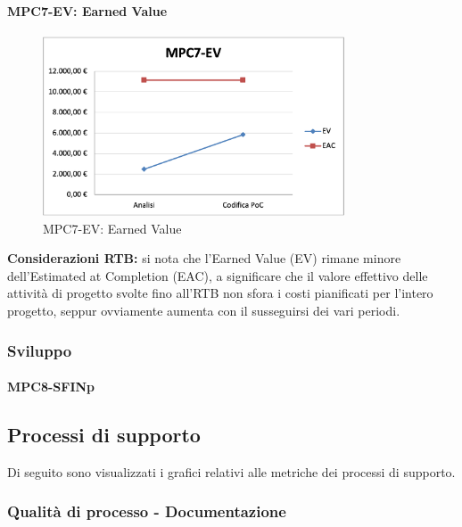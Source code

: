 \paragraph{MPC7-EV: Earned Value}
\begin{figure}[h!] 
    \centering
    \includegraphics[width=0.8\textwidth]{images/MPC7-EV.png}
    \caption{MPC7-EV: Earned Value}
\end{figure}
\noindent \textbf{Considerazioni RTB:} si nota che l'Earned Value (EV) rimane minore dell'Estimated at Completion (EAC), a significare che il valore effettivo delle attività di progetto svolte fino all'RTB non sfora i costi pianificati per l'intero progetto, seppur ovviamente aumenta con il susseguirsi dei vari periodi.

\subsubsection{Sviluppo} \label{sec:sviluppo}
\paragraph{MPC8-SFINp}
\subsection{Processi di supporto} \label{sec:processi_di_supporto}
Di seguito sono visualizzati i grafici relativi alle metriche dei processi di supporto.
\subsubsection{Qualità di processo - Documentazione}
